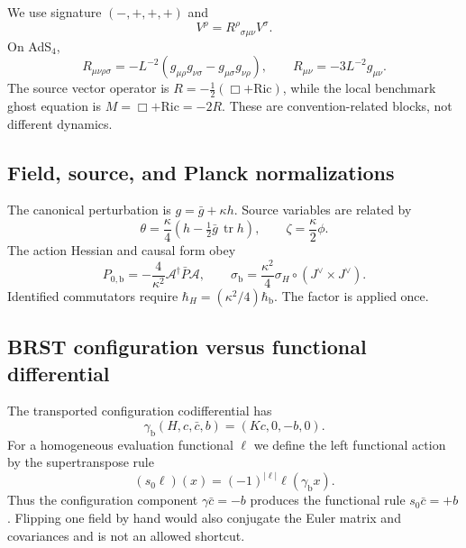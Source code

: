 \documentclass[11pt]{article}
\theoremstyle{definition}
\theoremstyle{remark}
\newcommand{\gbar}{\bar g}
\newcommand{\cbar}{\bar c}
\newcommand{\cA}{\mathcal A}
\newcommand{\hbarLB}{\hbar_{\mathrm{b}}}
\begin{document}
We use signature $(-,+,+,+)$ and
\begin{equation}
 [\nabla_\mu,\nabla_\nu]V^\rho
 =R^\rho{}_{\sigma\mu\nu}V^\sigma.
\end{equation}
On AdS$_4$,
\begin{equation}
 R_{\mu\nu\rho\sigma}
 =-L^{-2}(g_{\mu\rho}g_{\nu\sigma}-g_{\mu\sigma}g_{\nu\rho}),
 \qquad R_{\mu\nu}=-3L^{-2}g_{\mu\nu}.
\end{equation}
The source vector operator is $R=-\tfrac12(\Box+\mathrm{Ric})$, while the local benchmark
ghost equation is $M=\Box+\mathrm{Ric}=-2R$.  These are convention-related blocks,
not different dynamics.

\subsection{Field, source, and Planck normalizations}

The canonical perturbation is $g=\gbar+\kappa h$.  Source variables are related by
\begin{equation}
 \theta=\frac\kappa4(h-\tfrac12\gbar\,\operatorname{tr}h),
 \qquad \zeta=\frac\kappa2\phi.
\end{equation}
The action Hessian and causal form obey
\begin{equation}
 P_{0,\mathrm{b}}=-\frac4{\kappa^2}\cA^\dagger\bar P\cA,
 \qquad
 \sigma_{\mathrm{b}}=\frac{\kappa^2}{4}\sigma_H\circ(J^\vee\times J^\vee).
\end{equation}
Identified commutators require $\hbar_H=(\kappa^2/4)\hbarLB$.  The factor is applied
once.

\subsection{BRST configuration versus functional differential}

The transported configuration codifferential has
\begin{equation}
 \gamma_{\mathrm{b}}(H,c,\cbar,b)=(Kc,0,-b,0).
\end{equation}
For a homogeneous evaluation functional $\ell$ we define the left functional action by
the supertranspose rule
\begin{equation}
 (s_0\ell)(x)=(-1)^{|\ell|}\ell(\gamma_{\mathrm{b}}x).
\end{equation}
Thus the configuration component $\gamma\cbar=-b$ produces the functional rule
$s_0\cbar=+b$.  Flipping one field by hand would also conjugate the Euler matrix and
covariances and is not an allowed shortcut.
\end{document}
